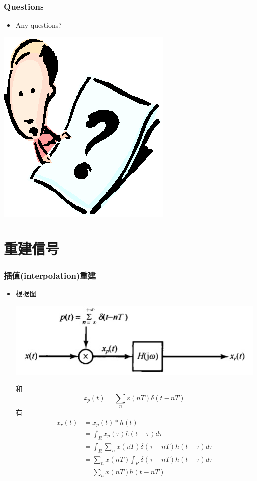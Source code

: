 \documentclass[CJKutf8,dvipsnames,table]{beamer}
\begin{document}
\begin{CJK*}{UTF8}{song}
  \begin{frame}
    \frametitle{Questions}
    \begin{itemize}
    \item Any questions?
    \end{itemize}
    \begin{center}
      \includegraphics[scale=.5]{question}
    \end{center}
  \end{frame} 
  
  \section{重建信号}

  \begin{frame}
    \frametitle{插值(interpolation)重建}
    \begin{itemize}
    \item 根据图
	    \begin{center}
    	\includegraphics[scale=.3]{ss-c-f7-4a}
    	\end{center}
	和
    	\[
    	x_p(t)=\sum_n x(nT)\delta(t-nT)
    	\]
	有
    	\begin{align*}
        	x_r(t) & = x_p(t)*h(t) \\
			& = \int_R x_p(\tau)h(t-\tau)d\tau \\
			& = \int_R \sum_n x(nT)\delta(\tau-nT) h(t-\tau)d\tau \\
			& = \sum_n x(nT) \int_R \delta(\tau-nT) h(t-\tau)d\tau \\
			& = \sum_n x(nT) h(t-nT)
    	\end{align*}   
    \end{itemize}
  \end{frame} 


\end{CJK*}
\end{document}
